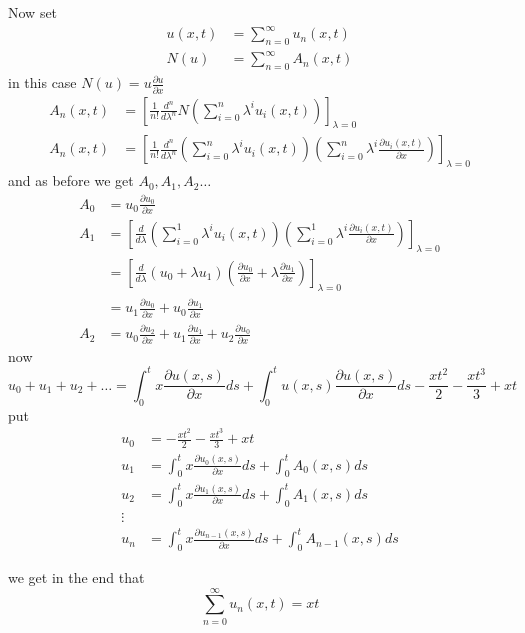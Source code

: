 \documentclass[]{article}
\begin{document}
Now set
\begin{align*}
    u(x,t) &= \sum_{n=0}^{\infty} u_n(x,t)
\\
N(u) &= \sum_{n=0}^{\infty} A_n(x,t)
\end{align*}
in this case $N(u) = u \frac{\partial u}{\partial x}$
\begin{align*}
A_n(x,t) &= \left[\frac{1}{n!} \frac{d^n}{d \lambda^n} N\left(\sum_{i=0}^{n}  \lambda^i u_i(x,t)\right)\right]_{\lambda = 0}
\\
A_n(x,t) &= \left[\frac{1}{n!} \frac{d^n}{d \lambda^n} \left(\sum_{i=0}^{n}  \lambda^i u_i(x,t)\right)\left(\sum_{i=0}^{n}  \lambda^i \frac{\partial u_i(x,t)}{\partial x}\right)\right]_{\lambda = 0}
\end{align*}
and as before we get $A_0,A_1,A_2\dots$
\begin{align*}
    A_0 &= u_0\frac{\partial u_0}{\partial x}
    \\
    A_1 &= \left[\frac{d}{d \lambda} \left(\sum_{i=0}^{1}  \lambda^i u_i(x,t)\right)\left(\sum_{i=0}^{1}  \lambda^i \frac{\partial u_i(x,t)}{\partial x}\right)\right]_{\lambda = 0}
    \\
    &= \left[\frac{d}{d \lambda} \left(u_0 + \lambda u_1 \right)\left(\frac{\partial u_0}{\partial x} + \lambda\frac{\partial u_1}{\partial x}\right)\right]_{\lambda = 0}
    \\
    &= u_1 \frac{\partial u_0}{\partial x} + u_0 \frac{\partial u_1}{\partial x}
    \\
    A_2 &= u_0 \frac{\partial u_2}{\partial x} + u_1 \frac{\partial u_1}{\partial x} + u_2 \frac{\partial u_0}{\partial x}
\end{align*}
now 
\[
u_0 + u_1 + u_2+\dots = \int_{0}^{t}x\frac{\partial u(x,s)}{\partial x}ds + \int_{0}^{t}u(x,s)\frac{\partial u(x,s)}{\partial x}ds - \frac{xt^2}{2} - \frac{xt^3}{3} + xt
\]
put 
\begin{align*}
    u_0 &=  - \frac{xt^2}{2} - \frac{xt^3}{3} + xt
    \\
    u_1 &= \int_{0}^{t}x\frac{\partial u_0(x,s)}{\partial x}ds + \int_{0}^{t}A_0(x,s)ds
    \\
    u_2 &= \int_{0}^{t}x\frac{\partial u_1(x,s)}{\partial x}ds + \int_{0}^{t}A_1(x,s)ds
    \\
    \vdots
    \\
    u_n &= \int_{0}^{t}x\frac{\partial u_{n-1}(x,s)}{\partial x}ds + \int_{0}^{t}A_{n-1}(x,s)ds
\end{align*}

we get in the end that 
\begin{equation*}
    \sum_{n=0}^{\infty} u_n(x,t) = xt
\end{equation*}
\end{document}
